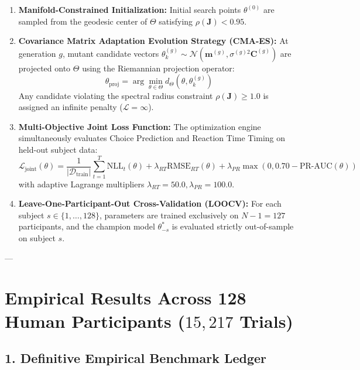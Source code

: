 \documentclass[11pt,twoside,a4paper]{article}
\begin{document}
\begin{enumerate}
    \item \textbf{Manifold-Constrained Initialization:}
    Initial search points $\theta^{(0)}$ are sampled from the geodesic center of $\Theta$ satisfying $\rho(\mathbf{J}) < 0.95$.
    \item \textbf{Covariance Matrix Adaptation Evolution Strategy (CMA-ES):}
    At generation $g$, mutant candidate vectors $\theta_k^{(g)} \sim \mathcal{N}(\mathbf{m}^{(g)}, \sigma^{(g)2} \mathbf{C}^{(g)})$ are projected onto $\Theta$ using the Riemannian projection operator:
    \begin{equation}
    \theta_{\text{proj}} = \arg\min_{\theta \in \Theta} d_{\Theta}(\theta, \theta_k^{(g)})
    \end{equation}
    Any candidate violating the spectral radius constraint $\rho(\mathbf{J}) \ge 1.0$ is assigned an infinite penalty ($\mathcal{L} = \infty$).
    \item \textbf{Multi-Objective Joint Loss Function:}
    The optimization engine simultaneously evaluates Choice Prediction and Reaction Time Timing on held-out subject data:
    \begin{equation}
    \mathcal{L}_{\text{joint}}(\theta) = \frac{1}{|\mathcal{D}_{\text{train}}|} \sum_{t=1}^{T} \text{NLL}_t(\theta) + \lambda_{RT} \text{RMSE}_{RT}(\theta) + \lambda_{PR} \max(0, 0.70 - \text{PR-AUC}(\theta))
    \end{equation}
    with adaptive Lagrange multipliers $\lambda_{RT} = 50.0, \lambda_{PR} = 100.0$.
    \item \textbf{Leave-One-Participant-Out Cross-Validation (LOOCV):}
    For each subject $s \in \{1, \dots, 128\}$, parameters are trained exclusively on $N-1 = 127$ participants, and the champion model $\theta^*_{-s}$ is evaluated strictly out-of-sample on subject $s$.
\end{enumerate}

---

\section{Empirical Results Across 128 Human Participants ($15,217$ Trials)}

\subsection{1. Definitive Empirical Benchmark Ledger}
\end{document}
